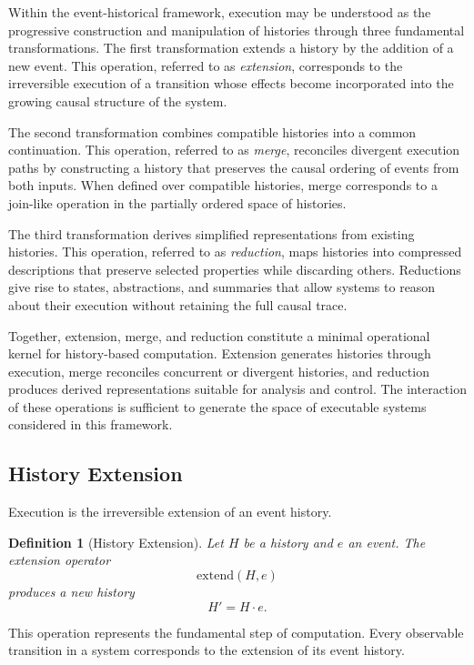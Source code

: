 \documentclass[12pt]{article}
\newtheorem{definition}{Definition}
\begin{document}
Within the event-historical framework, execution may
be understood as the progressive construction and
manipulation of histories through three fundamental
transformations. The first transformation extends a
history by the addition of a new event. This operation,
referred to as \emph{extension}, corresponds to the
irreversible execution of a transition whose effects
become incorporated into the growing causal structure
of the system.

The second transformation combines compatible histories
into a common continuation. This operation, referred to
as \emph{merge}, reconciles divergent execution paths
by constructing a history that preserves the causal
ordering of events from both inputs. When defined over
compatible histories, merge corresponds to a join-like
operation in the partially ordered space of histories.

The third transformation derives simplified
representations from existing histories. This operation,
referred to as \emph{reduction}, maps histories into
compressed descriptions that preserve selected
properties while discarding others. Reductions give
rise to states, abstractions, and summaries that allow
systems to reason about their execution without
retaining the full causal trace.

Together, extension, merge, and reduction constitute a
minimal operational kernel for history-based computation.
Extension generates histories through execution, merge
reconciles concurrent or divergent histories, and
reduction produces derived representations suitable
for analysis and control. The interaction of these
operations is sufficient to generate the space of
executable systems considered in this framework.

\subsection{History Extension}

Execution is the irreversible extension of an event history.

\begin{definition}[History Extension]
Let $H$ be a history and $e$ an event. The extension operator
\[
\mathrm{extend}(H,e)
\]
produces a new history
\[
H' = H \cdot e.
\]
\end{definition}

This operation represents the fundamental step of computation.
Every observable transition in a system corresponds to the
extension of its event history.
\end{document}
